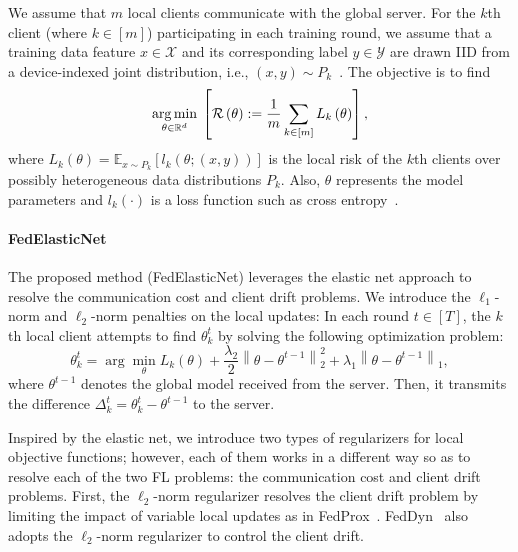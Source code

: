 \documentclass{article} %
\begin{document}
We assume that $m$ local clients communicate with the global server. For the $k$th client (where $k \in \left [ m \right ]$) participating in each training round, we assume that a training data feature $x \in \mathcal{X}$ and its corresponding label $y \in \mathcal{Y}$ are drawn IID from a device-indexed joint distribution, i.e., $ \left( x, y \right) \sim P_{k}$~\citep{Acar2021federated}. The objective is to find
\begin{equation}
\underset{\theta \in \mathbb{R}^{d}}{\operatorname*{arg\,min}} \: \left[ \mathcal{R}\left ( \theta \right ) := \frac{1}{m}\sum_{k\in [m]}{L_{k}\left( \theta \right)} \right],
\end{equation}
where $L_{k} \left ( \theta \right ) = \mathbb{E}_{x \sim P_k} \left[ l_k \left ( \theta;\left ( x,y \right ) \right ) \right]$ is the local risk of the $k$th clients over possibly heterogeneous data distributions $P_k$. Also, $\theta$ represents the model parameters and $l_k(\cdot)$ is a loss function such as cross entropy~\citep{Acar2021federated}.

\paragraph{FedElasticNet}

The proposed method (FedElasticNet) leverages the elastic net approach to resolve the communication cost and client drift problems. We introduce the $\ell_1$-norm and $\ell_2$-norm penalties on the local updates: In each round $t \in [T]$, the $k$th local client attempts to find $\theta_k^t$ by solving the following optimization problem: 
\begin{equation} \label{eq:local_objective}
    \theta_k^t = \arg \min_{\theta} L_{k}\left ( \theta \right )+ \frac{\lambda_2}{2} \left\| \theta - \theta^{t-1}\right\|^{2}_{2}+ \lambda_1 \left\|\theta - \theta^{t-1} \right\|_{1},
\end{equation}
where $\theta^{t-1}$ denotes the global model received from the server. Then, it transmits the difference $\Delta_k^t=\theta_k^t - \theta^{t-1}$ to the server.

Inspired by the elastic net, we introduce two types of regularizers for local objective functions; however, each of them works in a different way so as to resolve each of the two FL problems: the communication cost and client drift problems. First, the $\ell_2$-norm regularizer resolves the client drift problem by limiting the impact of variable local updates as in FedProx~\citep{Li2020federated}. FedDyn~\citep{Acar2021federated} also adopts the $\ell_2$-norm regularizer to control the client drift.
\end{document}
